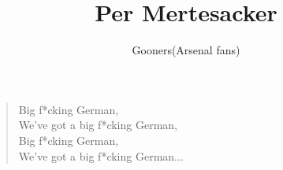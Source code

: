 \documentclass[a4paper,12pt]{article}
\title{Per Mertesacker}
\author{Gooners(Arsenal fans)}
\date{}
\begin{document}
	
	\maketitle
	
	\begin{verse}
		
		Big f*cking German, \\
		We've got a big f*cking German, \\
		Big f*cking German, \\
		We've got a big f*cking German$\ldots$
		
	\end{verse}
	
\end{document}
